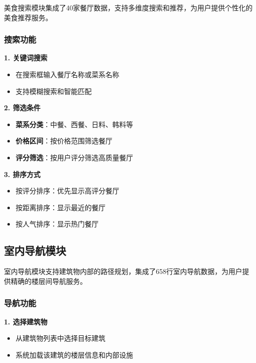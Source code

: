 \documentclass[12pt, a4paper]{article}
\begin{document}
\begin{successbox}[title={美食推荐系统}]
美食搜索模块集成了40家餐厅数据，支持多维度搜索和推荐，为用户提供个性化的美食推荐服务。
\end{successbox}

\subsubsection{搜索功能}

\textbf{1. 关键词搜索}
\begin{itemize}
    \item 在搜索框输入餐厅名称或菜系名称
    \item 支持模糊搜索和智能匹配
\end{itemize}

\textbf{2. 筛选条件}
\begin{itemize}
    \item \textbf{菜系分类}：中餐、西餐、日料、韩料等
    \item \textbf{价格区间}：按价格范围筛选餐厅
    \item \textbf{评分筛选}：按用户评分筛选高质量餐厅
\end{itemize}

\textbf{3. 排序方式}
\begin{itemize}
    \item 按评分排序：优先显示高评分餐厅
    \item 按距离排序：显示最近的餐厅
    \item 按人气排序：显示热门餐厅
\end{itemize}

\subsection{室内导航模块}

\begin{infobox}[title={室内导航系统}]
室内导航模块支持建筑物内部的路径规划，集成了658行室内导航数据，为用户提供精确的楼层间导航服务。
\end{infobox}

\subsubsection{导航功能}

\textbf{1. 选择建筑物}
\begin{itemize}
    \item 从建筑物列表中选择目标建筑
    \item 系统加载该建筑的楼层信息和内部设施
\end{itemize}
\end{document}
